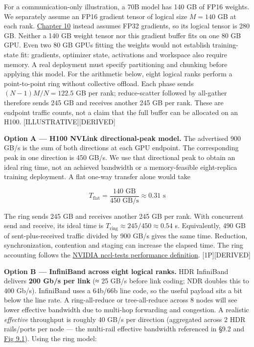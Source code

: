 \label{worked-example}


For a communication-only illustration, a 70B model has 140 GB of FP16
weights. We separately assume an FP16 gradient tensor of logical size
\(M=140\) GB at each rank. \hyperref[chap:10]{Chapter 10} instead assumes FP32 gradients, so
its logical tensor is 280 GB. Neither a 140 GB weight tensor nor this
gradient buffer fits on one 80 GB GPU. Even two 80 GB GPUs fitting the
weights would not establish training-state fit: gradients, optimizer
state, activations and workspace also require memory. A real deployment
must specify partitioning and chunking before applying this model. For
the arithmetic below, eight logical ranks perform a point-to-point ring
without collective offload. Each phase sends \((N-1)M/N=122.5\) GB per
rank; reduce-scatter followed by all-gather therefore sends 245 GB and
receives another 245 GB per rank. These are endpoint traffic counts, not
a claim that the full buffer can be allocated on an H100.
\mbox{{[}ILLUSTRATIVE{]}}\hspace{0pt}\mbox{{[}DERIVED{]}}

\textbf{Option A --- H100 NVLink directional-peak model.} The advertised
900 GB/s is the sum of both directions at each GPU endpoint. The
corresponding peak in one direction is 450 GB/s. We use that directional
peak to obtain an ideal ring time, not an achieved bandwidth or a
memory-feasible eight-replica training deployment. A flat one-way
transfer alone would take

\[
T_{\text{flat}} = \frac{140 \text{ GB}}{450 \text{ GB/s}} \approx 0.31 \text{ s}
\]

The ring sends 245 GB and receives another 245 GB per rank. With
concurrent send and receive, its ideal time is
\(T_\text{ring} \approx 245/450 \approx 0.54\) s. Equivalently, 490 GB
of sent-plus-received traffic divided by 900 GB/s gives the same time.
Reduction, synchronization, contention and staging can increase the
elapsed time. The ring accounting follows the
\href{https://github.com/NVIDIA/nccl-tests/blob/afd59abab774a6a4b492eb344bd0c845a0b7bb4d/doc/PERFORMANCE.md}{NVIDIA
nccl-tests performance definition}. \mbox{{[}1P{]}}\hspace{0pt}\mbox{{[}DERIVED{]}}

\textbf{Option B --- InfiniBand across eight logical ranks.} HDR
InfiniBand delivers \textbf{200 Gb/s per link} (≈ 25 GB/s before link
coding; NDR doubles this to 400 Gb/s). InfiniBand uses a 64b/66b line
code, so the useful payload sits a bit below the line rate. A
ring-all-reduce or tree-all-reduce across 8 nodes will see lower
effective bandwidth due to multi-hop forwarding and congestion. A
realistic \emph{effective} throughput is roughly 40 GB/s per direction
(aggregated across 2 HDR rails/ports per node --- the multi-rail
effective bandwidth referenced in §9.2 and \hyperref[fig:9.1]{Fig 9.1}). Using the ring
model:

